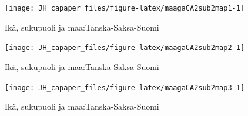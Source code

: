 \documentclass[
  finnish,
]{book}
\begin{document}
\begin{figure}

{\centering \texttt{[image: JH\_capaper\_files/figure-latex/maagaCA2sub2map1-1]} 

}

\caption{Ikä, sukupuoli ja maa:Tanska-Saksa-Suomi}\label{fig:maagaCA2sub2map1}
\end{figure}

\begin{figure}

{\centering \texttt{[image: JH\_capaper\_files/figure-latex/maagaCA2sub2map2-1]} 

}

\caption{Ikä, sukupuoli ja maa:Tanska-Saksa-Suomi}\label{fig:maagaCA2sub2map2}
\end{figure}

\begin{figure}

{\centering \texttt{[image: JH\_capaper\_files/figure-latex/maagaCA2sub2map3-1]} 

}

\caption{Ikä, sukupuoli ja maa:Tanska-Saksa-Suomi}\label{fig:maagaCA2sub2map3}
\end{figure}
\end{document}
